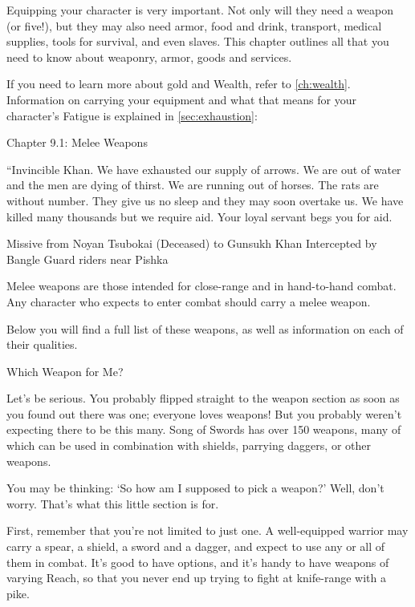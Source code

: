 \documentclass[oneside,11pt,english]{book}
\begin{document}
Equipping your character is very important. Not only will they need a weapon (or five!), but they may 
also need armor, food and drink, transport, medical supplies, tools for survival, and even slaves. This 
chapter outlines all that you need to know about weaponry, armor, goods and services. 
 

If you need to learn more about gold and Wealth, refer to \autoref{ch:wealth}. Information on carrying your equipment and what that means for your character’s Fatigue is explained in \autoref{sec:exhaustion}:~


Chapter 9.1: Melee Weapons 


“Invincible Khan. We have exhausted our supply of arrows. We are out of water and the men are dying of 
thirst. We are running out of horses. The rats are without number. They give us no sleep and they may 
soon overtake us. We have killed many thousands but we require aid. Your loyal servant begs you for aid. 

 

Missive from Noyan Tsubokai (Deceased) to Gunsukh Khan 
Intercepted by Bangle Guard riders near Pishka 

 

 

Melee weapons are those intended for close-range and in hand-to-hand combat. Any character who 
expects to enter combat should carry a melee weapon. 

 

Below you will find a full list of these weapons, as well as information on each of their qualities. 

 

Which Weapon for Me? 

 

Let’s be serious. You probably flipped straight to the weapon section as soon as you found out there was 
one; everyone loves weapons! But you probably weren’t expecting there to be this many. Song of Swords 
has over 150 weapons, many of which can be used in combination with shields, parrying daggers, or other 
weapons. 

 

You may be thinking: ‘So how am I supposed to pick a weapon?’ Well, don’t worry. That’s what this 
little section is for. 


 

First, remember that you’re not limited to just one. A well-equipped warrior may carry a spear, a shield, a 
sword and a dagger, and expect to use any or all of them in combat. It’s good to have options, and it’s 
handy to have weapons of varying Reach, so that you never end up trying to fight at knife-range with a 
pike. 
\end{document}
